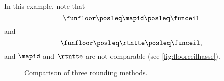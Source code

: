\begin{example}
\begin{widepar}
\begin{equation}
{            }
        \end{equation}
    \end{widepar}
    In this example, note that
    \begin{equation}
        \funfloor \posleq \mapid \posleq \funceil
    \end{equation}
    and
    \begin{equation}
        \funfloor \posleq \rtntte \posleq \funceil,
    \end{equation}
    and $\mapid$ and $\rtntte$ are not comparable (see \cref{fig:floorceilhasse}).
    \begin{marginfigure}
        \caption{}
        \label{fig:floorceilhasse}
    \end{marginfigure}
\end{example}

\begin{figure*}[b]
    \centering
    \hfill
    \hfill
    \caption{Comparison of three rounding methods.}
\end{figure*}